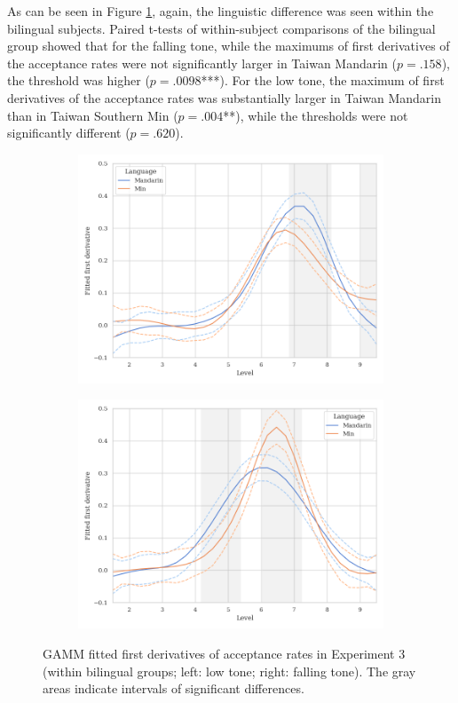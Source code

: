 As can be seen in Figure \ref{Figure:E3GAMM_bilingual}, again, the linguistic difference was seen within the bilingual subjects. Paired t-tests of within-subject comparisons of the bilingual group showed that for the falling tone, while the maximums of first derivatives of the acceptance rates were not significantly larger in Taiwan Mandarin ($p=.158$), the threshold was higher ($p=.0098$***). For the low tone, the maximum of first derivatives of the acceptance rates was substantially larger in Taiwan Mandarin than in Taiwan Southern Min ($p=.004$**), while the thresholds were not significantly different ($p=.620$).

\begin{figure}[hbt!]
\centering
\begin{subfigure}[b]{.45\textwidth}
\centering
\includegraphics[width=\textwidth]{figures/E3/Tone21_speed_GAMM_bilingual.png}
\end{subfigure}
\hfill
\begin{subfigure}[b]{.45\textwidth}
\centering
\includegraphics[width=\textwidth]{figures/E3/Tone51_speed_GAMM_bilingual.png}
\end{subfigure}
\caption{GAMM fitted first derivatives of acceptance rates in Experiment 3 (within bilingual groups; left: low tone; right: falling tone). The gray areas indicate intervals of significant differences.}
\label{Figure:E3GAMM_bilingual}
\end{figure}

